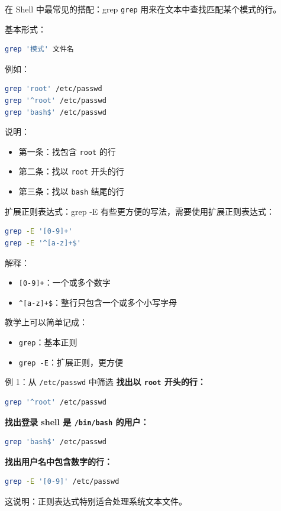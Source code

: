 \documentclass[aspectratio=169]{beamer}
\begin{document}
\begin{frame}[fragile]{在 Shell 中最常见的搭配：grep}
\texttt{grep} 用来在文本中查找匹配某个模式的行。

\vspace{0.5em}
基本形式：
\begin{lstlisting}[language=bash]
grep '模式' 文件名
\end{lstlisting}

例如：
\begin{lstlisting}[language=bash]
grep 'root' /etc/passwd
grep '^root' /etc/passwd
grep 'bash$' /etc/passwd
\end{lstlisting}

说明：
\begin{itemize}
  \item 第一条：找包含 \texttt{root} 的行
  \item 第二条：找以 \texttt{root} 开头的行
  \item 第三条：找以 \texttt{bash} 结尾的行
\end{itemize}
\end{frame}

\begin{frame}[fragile]{扩展正则表达式：grep -E}
有些更方便的写法，需要使用扩展正则表达式：

\begin{lstlisting}[language=bash]
grep -E '[0-9]+'
grep -E '^[a-z]+$'
\end{lstlisting}

\vspace{0.5em}
解释：
\begin{itemize}
  \item \verb|[0-9]+|：一个或多个数字
  \item \verb|^[a-z]+$|：整行只包含一个或多个小写字母
\end{itemize}

\vspace{0.8em}
教学上可以简单记成：
\begin{itemize}
  \item \texttt{grep}：基本正则
  \item \texttt{grep -E}：扩展正则，更方便
\end{itemize}
\end{frame}

\begin{frame}[fragile]{例 1：从 \texttt{/etc/passwd} 中筛选}
\textbf{找出以 \texttt{root} 开头的行：}
\begin{lstlisting}[language=bash]
grep '^root' /etc/passwd
\end{lstlisting}

\textbf{找出登录 shell 是 \texttt{/bin/bash} 的用户：}
\begin{lstlisting}[language=bash]
grep 'bash$' /etc/passwd
\end{lstlisting}

\textbf{找出用户名中包含数字的行：}
\begin{lstlisting}[language=bash]
grep -E '[0-9]' /etc/passwd
\end{lstlisting}

\vspace{0.5em}
这说明：正则表达式特别适合处理系统文本文件。
\end{frame}
\end{document}
